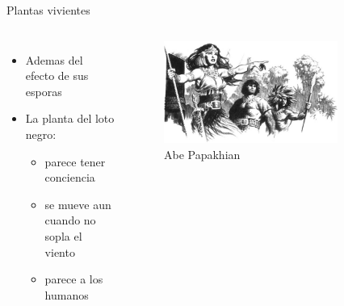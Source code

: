 \begin{frame}{Plantas vivientes}
	\begin{columns}
		\begin{itemize}
			\item Ademas del efecto de sus esporas
			\item La planta del loto negro:
			\begin{itemize}
				\item parece tener conciencia
				\item se mueve aun cuando no sopla el viento
				\item parece  a los humanos
			\end{itemize}
		\end{itemize}
		\begin{figure}[htb]
			\centering
			\includegraphics[width=0.8\textwidth]{img/tributos/elephant07}
			\caption{Abe Papakhian}
		\end{figure}
	\end{columns}
\end{frame}
\note[itemize]{
	\item
}

